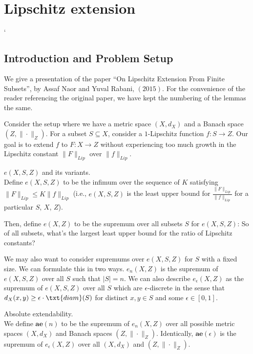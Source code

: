 \chapter{Lipschitz extension}

`

\section{Introduction and Problem Setup}

We give a presentation of the paper ``On Lipschitz Extension From Finite Subsets'', by Assaf Naor and Yuval Rabani, $(2015)$. For the convenience of the reader referencing the original paper, we have kept the numbering of the lemmas the same.

Consider the setup where we have a metric space $(X, d_X)$ and a Banach space $(Z, \|\cdot\|_Z)$. For a subset $S \subseteq X$,
consider a $1$-Lipschitz function $f: S \to Z$. Our goal is to extend $f$ to $F:X \to Z$ without experiencing too much growth
in the Lipschitz constant $\|F\|_{Lip}$ over $\|f\|_{Lip}$. 

\begin{df} $e(X, S, Z)$ and its variants. \\
Define $e(X, S, Z)$ to be the infimum over the sequence of $K$ satisfying
$\|F\|_{Lip} \leq K\|f\|_{Lip}$ (i.e., $e(X, S, Z)$ is the least upper bound for $\frac{\|F\|_{Lip}}{\|f\|_{Lip}}$ for a particular $S$, $X$, $Z$).

Then, define $e(X, Z)$ to be the supremum over all subsets $S$ for $e(X, S, Z)$: So of all subsets, what's the largest least upper bound for the ratio of Lipschitz constants? 

We may also want to consider supremums over $e(X, S, Z)$ for $S$ with a fixed size. We can formulate this in two ways.
$e_n(X, Z)$ is the supremum of $e(X, S, Z)$ over all $S$ such that $|S| = n$.
We can also describe $e_{\epsilon}(X, Z)$ as the supremum of $e(X, S, Z)$ over all $S$ which are $\epsilon$-discrete in the sense that $d_X(x, y) \geq \epsilon\cdot \txt{diam}(S)$ for distinct $x, y \in S$ and some $\epsilon \in [0, 1]$.
\end{df}

\begin{df} Absolute extendability. \\
We define $\textbf{ae}(n)$ to be the supremum of $e_n(X, Z)$ over all possible metric spaces $(X, d_X)$ and Banach spaces $(Z, \|\cdot\|_Z)$.
Identically, $\textbf{ae}(\epsilon)$ is the supremum of $e_{\epsilon}(X, Z)$ over all $(X, d_X)$ and $(Z, \|\cdot\|_Z)$. 
\end{df}

